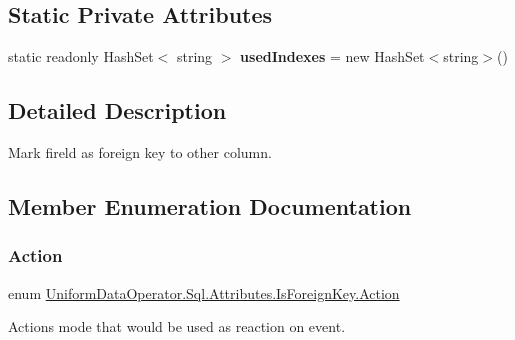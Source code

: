 \subsection*{Static Private Attributes}
\begin{DoxyCompactItemize}
\item 
\mbox{\label{class_uniform_data_operator_1_1_sql_1_1_attributes_1_1_is_foreign_key_a30ca24c3d7b8c38c36a112c6d3d9db55}} 
static readonly Hash\+Set$<$ string $>$ {\bfseries used\+Indexes} = new Hash\+Set$<$string$>$()
\end{DoxyCompactItemize}


\subsection{Detailed Description}
Mark fireld as foreign key to other column. 



\subsection{Member Enumeration Documentation}
\mbox{\label{class_uniform_data_operator_1_1_sql_1_1_attributes_1_1_is_foreign_key_a6039622384e2bbd1aa386e326ee0f850}} 
\subsubsection{\texorpdfstring{Action}{Action}}
{\footnotesize\ttfamily enum \mbox{\hyperlink{class_uniform_data_operator_1_1_sql_1_1_attributes_1_1_is_foreign_key_a6039622384e2bbd1aa386e326ee0f850}{Uniform\+Data\+Operator.\+Sql.\+Attributes.\+Is\+Foreign\+Key.\+Action}}\hspace{0.3cm}{\ttfamily [strong]}}



Action\textquotesingle{}s mode that would be used as reaction on event. 

